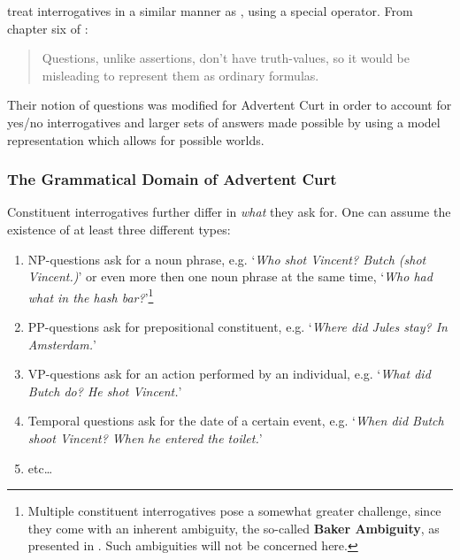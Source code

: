 \documentclass[notitlepage,twoside,a4paper]{scrreprt}
\newcommand{\term}[1]{\textsf{\textbf{#1}}} %
\newcommand{\pn}{\textsf} %
\newcommand{\example}[1]{`\textit{#1}'} %
\newenvironment{quotes}{\begin{quote}\sf}{\rm\end{quote}}
\newcommand{\acurt}{\pn{Advertent Curt}}
\theoremstyle{remark}
\theoremstyle{remark}
\theoremstyle{definition}
\theoremstyle{definition}
\begin{document}

\cite{blackburnbos:cl1} treat interrogatives in a similar manner as \cite{gs:q},
using a special operator. From chapter six of \cite{blackburnbos:cl1}:

\begin{quotes}
  Questions, unlike assertions, don't have truth-values, so it would be
  misleading to represent them as ordinary formulas.
\end{quotes}

Their notion of questions was modified for \acurt{} in order to account for
yes/no interrogatives and larger sets of answers made possible by using a model
representation which allows for possible worlds.

\subsubsection{The Grammatical Domain of \acurt}

Constituent interrogatives further differ in \emph{what} they ask for. One can
assume the existence of at least three different types:

\begin{enumerate}
  \item NP-questions ask for a noun phrase, e.g. \example{Who shot Vincent?
  Butch (shot Vincent.)} or even more then one noun phrase at the same time, \example{Who had
  what in the hash bar?}\footnote{Multiple constituent interrogatives pose a
  somewhat greater challenge, since they come with an inherent ambiguity, the
  so-called \term{Baker Ambiguity}, as presented in \cite{baker:1970}.
  Such ambiguities will not be concerned here.}
  \item PP-questions ask for prepositional constituent, e.g. \example{Where did
  Jules stay? In Amsterdam.}
  \item VP-questions ask for an action performed by an individual, e.g.
  \example{What did Butch do? He shot Vincent.}
  \item Temporal questions ask for the date of a certain event, e.g.
  \example{When did Butch shoot Vincent? When he entered the toilet.}
  \item etc\ldots
\end{enumerate}
\end{document}
